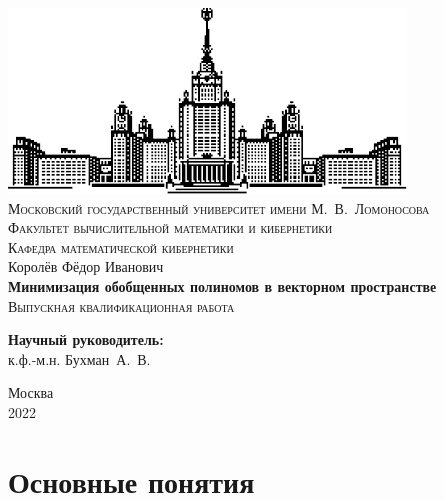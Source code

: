 \documentclass[a4paper,12pt,titlepage]{article}
\begin{document}
\hypersetup{pageanchor=false}
\begin{titlepage}
    \begin{center}
        \includegraphics{logo.pdf} \\
        \textsc{\small Московский государственный университет имени М.~В.~Ломоносова \\
        Факультет вычислительной математики и кибернетики \\
        Кафедра математической кибернетики \\}
        \vfill
        \large{Королёв Фёдор Иванович} \\
        \vspace{1cm}
        \textbf{\large Минимизация обобщенных полиномов в векторном пространстве} \\
        \vfill
        \textsc{\large Выпускная квалификационная работа} \\
    \end{center}
    \begin{flushright}
        \vfill
        \textbf{Научный руководитель:} \\
        к.ф.-м.н. Бухман~А.~В.
    \end{flushright}
    \begin{center}
        \vfill
        {\small Москва \\
        2022}
    \end{center}
\end{titlepage}

\hypersetup{pageanchor=true}
\tableofcontents
\newpage

\section{Основные понятия}
\end{document}
